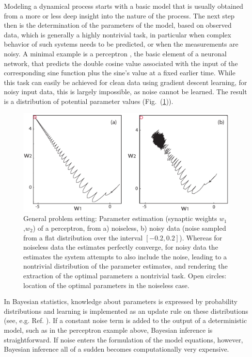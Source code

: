 \documentclass[11pt]{article}
\theoremstyle{definition}
\begin{document}
Modeling a dynamical process starts with a basic model that is usually obtained from a more or less deep insight into the nature of the process. The next step then is the determination of the parameters of the model, based on observed data, which is generally a highly nontrivial task, in particular when complex behavior of such systems needs to be predicted, or when the measurements are noisy.
A minimal example is a perceptron \cite{rosenblatt_1958_perceptron, steeb_2004_problems}, the basic element of a neuronal network, that predicts the double cosine value associated with the input of the corresponding sine function plus the sine's value at a fixed earlier time. While this task can easily be achieved for clean data using gradient descent learning, for noisy input data, this is largely impossible, as noise cannot be learned. The result is a distribution of potential parameter values (Fig.~(\ref{neural})).
\begin{figure}[h]
    \centering
    \includegraphics[width=1.0\textwidth]{neuron.pdf}
    \caption{General problem setting: Parameter estimation (synaptic weights $w_1$,$w_2$) of a perceptron, from a) noiseless, b) noisy data (noise sampled from a flat distribution over the  interval $[-0.2,0.2]$). Whereas for noiseless data the estimates perfectly converge, for noisy data the estimates  the system attempts to also include the noise, leading to a nontrivial distribution of the parameter estimates, and rendering the extraction of the optimal parameters a nontrivial task. Open circles: location of the optimal parameters in the noiseless case.}
    \label{neural}
\end{figure}

In Bayesian statistics, knowledge about parameters is expressed by probability distributions and learning is implemented as an update rule on these distributions (see, e.g. Ref. \cite{box_2011_bayesian}).
If a constant noise term is added to the output of a deterministic model, such as in the perceptron example above, Bayesian inference is straightforward.
If noise enters the formulation of the model equations, however, Bayesian inference all of a sudden becomes computationally very expensive.
\end{document}
